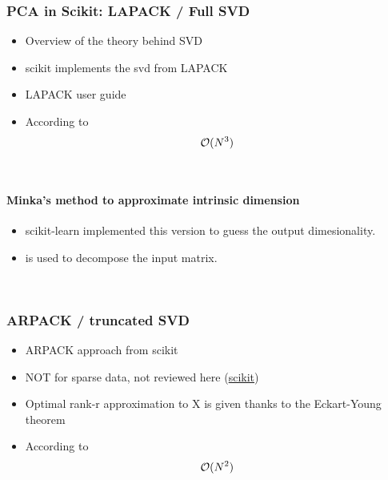 \clearpage



\subsubsection{PCA in Scikit: LAPACK / Full SVD}

\begin{itemize}
	\item Overview of the theory behind SVD
	\item scikit implements the svd from LAPACK
	\item LAPACK user guide \cite{anderson1999lapack}
	\item According to \cite{wright2001large}
	$$\mathcal{O}(N^3)$$
\end{itemize}

\ \clearpage
\ \clearpage


\paragraph{Minka's method to approximate intrinsic dimension}

\begin{itemize}
	\item scikit-learn implemented this version \cite{minka2000automatic} to guess the output dimesionality. 
	\item \cite{halko2011finding, brunton2019data} is used to decompose the input matrix.
\end{itemize}

\ \clearpage


\subsubsection{ARPACK / truncated SVD}

\begin{itemize}
	\item \cite{wright2001large} ARPACK approach from scikit
	\item NOT for sparse data, not reviewed here (\href{https://scikit-learn.org/stable/modules/generated/sklearn.decomposition.PCA.html}{scikit})
	\item Optimal rank-r approximation to X is given thanks to the Eckart-Young theorem \cite{eckart1936approximation}
	\item According to \cite{wright2001large, brunton2019data}
	$$\mathcal{O}(N^2)$$

\end{itemize}

